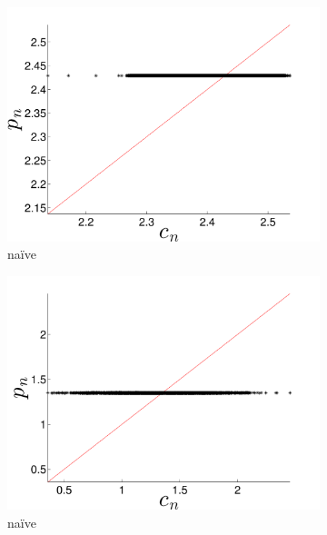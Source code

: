 \begin{figure}[htbp]
  \centering
      \begin{subfigure}{0.49\textwidth}
    \includegraphics[width=\textwidth]{figs/colMeanForecast}
    \caption{\col na\"ive }
    \label{fig:gccMEAN}
  \end{subfigure}%
   \begin{subfigure}{0.49\textwidth}
    \includegraphics[width=\textwidth]{figs/gccMeanForecast}
    \caption{\gcc na\"ive }
    \label{fig:gccMEAN}
  \end{subfigure}%
  \\
    \begin{subfigure}{0.49\textwidth}

\end{subfigure}
\end{figure}
